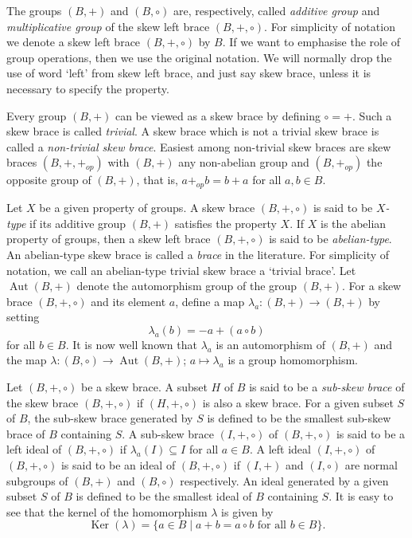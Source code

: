 \documentclass[11pt, oneside]{amsart}
\numberwithin{equation}{section}
\theoremstyle{plain}
\theoremstyle{definition}
\newcommand{\Aut}{\operatorname{Aut} }
\newcommand{\Ker}{\operatorname{Ker} }
\begin{document}
The groups $(B,+)$ and $(B,\circ)$ are, respectively, called  {\it additive group} and {\it multiplicative group} of the skew left brace $(B, +, \circ)$.  For simplicity of notation we denote a skew left brace $(B, +, \circ)$ by $B$. If we want to emphasise the role of  group operations, then we use the original notation.   We will normally drop the use of word `left' from skew left brace, and just say  skew brace, unless it is necessary to specify the property.

Every group $(B, +)$ can be viewed as a skew  brace by defining $\circ = +$. Such a skew brace is called \emph{trivial}. A skew brace which is not a trivial skew brace is called a \emph{non-trivial skew brace}.
 Easiest among non-trivial skew braces are skew braces $(B, +, +_{op})$ with $(B, +)$ any non-abelian group and $(B, +_{op})$  the opposite group of $(B, +)$, that is, $a +_{op} b = b + a$ for all $a, b \in B$.

   Let $X$ be a given property of  groups.   A skew brace $(B, +, \circ)$ is said to be {\it $X$-type} if its additive group $(B,+)$ satisfies  the property $X$. If $X$ is the abelian property of groups, then a  skew left brace $(B, +, \circ)$ is said to be  \emph{abelian-type}.  An abelian-type skew  brace is called a \emph{brace} in the literature. For simplicity of notation, we call an abelian-type trivial skew brace a `trivial brace'.
Let $\Aut(B, +)$ denote the automorphism group of the group $(B, +)$. For a skew brace  $(B, +, \circ)$ and its element  $a$, define a map $\lambda_a : (B, +) \to (B, +)$  by setting 
 $$\lambda_a(b) = - a + (a \circ b)$$ 
 for all $b \in B$. It is now well known that $\lambda_a$ is an automorphism of $(B, +)$ and the  map $\lambda : (B, \circ) \to \Aut(B, +)$; $a \mapsto \lambda_a$ is a group homomorphism. 
    

  Let $(B,  +, \circ)$ be a skew  brace. A subset $H$ of $B$ is said to be a {\it sub-skew  brace} of the skew   brace $(B, +, \circ)$  if $(H, + , \circ)$ is also a skew  brace.   For a given subset $S$ of $B$, the sub-skew brace generated by $S$ is defined to be the smallest sub-skew brace of $B$ containing $S$.  A sub-skew brace $(I, +, \circ)$ of  $(B, +, \circ)$  is said to be a left ideal of $(B, +, \circ)$ if $\lambda_a(I) \subseteq I$ for all  $a \in B$.  A left ideal $(I, +, \circ)$ of $(B, +, \circ)$ is said to be an ideal of $(B, +, \circ)$ if $(I, +)$ and $(I, \circ)$ are normal subgroups of $(B, +)$ and $(B, \circ)$ respectively.   An ideal generated by a given subset $S$ of $B$ is defined to be the smallest ideal of $B$ containing $S$. It is easy to see that the  kernel of the homomorphism $\lambda$ is given by 
 $$\Ker(\lambda) = \{a \in B \mid a + b = a \circ b \mbox{ for all } b \in B \}.$$
\end{document}
